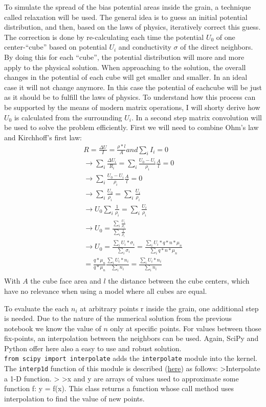 \documentclass[11pt]{article}
\begin{document}
To simulate the spread of the bias potential areas inside the grain, a
technique called relaxation will be used. The general idea is to guess
an initial potential distribution, and then, based on the laws of
physics, iteratively correct this guess. The correction is done by
re-calculating each time the potential \(U_0\) of one center-``cube''
based on potential \(U_i\) and conductivity \(\sigma\) of the direct
neighbors. By doing this for each ``cube'', the potential distribution
will more and more apply to the physical solution. When approaching to
the solution, the overall changes in the potential of each cube will get
smaller and smaller. In an ideal case it will not change anymore. In
this case the potential of eachcube will be just as it should be to
fulfill the laws of physics. To understand how this process can be
supported by the means of modern matrix operations, I will shorty derive
how \(U_0\) is calculated from the surrounding \(U_i\). In a second step
matrix convolution will be used to solve the problem efficiently. First
we will need to combine Ohm's law and Kirchhoff's first law:
\begin{align}
R  = \frac{\Delta U}{I} = \frac{{\rho}*l}{A} and \sum_{i}I_i=0\\
\rightarrow \sum_{i}\frac{\Delta U_i}{R_i} = \sum_{i}\frac{U_0-U_i}{\rho_i}\frac{A}{l}=0\\
\rightarrow \sum_{i}\frac{U_0-U_i}{\rho_i}\frac{A}{l}=0\\
\rightarrow \sum_{i}\frac{U_0}{\rho_i}=\sum_{i}\frac{U_i}{\rho_i}\\
\rightarrow U_0\sum_{i}\frac{1}{\rho_i}=\sum_{i}\frac{U_i}{\rho_i}\\
\rightarrow U_0=\frac{\sum_{i}\frac{U_i}{\rho_i}}{\sum_{i}\frac{1}{\rho_i}}\\
\rightarrow U_0=\frac{\sum_{i}{U_i*\sigma_i}}{\sum_{i}{\sigma_i}}=\frac{\sum_{i}{U_i*q*n*\mu_n }}{\sum_{i}{q*n*\mu_n }}\\=\frac{q*\mu_n}{q*\mu_n} \frac{\sum_{i}{U_i*n_i}}{\sum_{i}{n_i}}=\frac{\sum_{i}{U_i*n_i}}{\sum_{i}{n_i}}\label{u_center}\tag{$U_0$ from $U_i$}\\
\end{align} With \(A\) the cube face area and \(l\) the distance between
the cube centers, which have no relevance when using a model where all
cubes are equal.

    To evaluate the each \(n_i\) at arbitrary points r inside the grain, one
additional step is needed. Due to the nature of the numerical solution
from the previous notebook we know the value of \(n\) only at specific
points. For values between those fix-points, an interpolation between
the neighbors can be used. Again, SciPy and Python offer here also a
easy to use and robust solution.
\texttt{from\ scipy\ import\ interpolate} adds the \texttt{interpolate}
module into the kernel. The \texttt{interp1d} function of this module is
described
(\href{https://docs.scipy.org/doc/scipy/reference/generated/scipy.interpolate.interp1d.htm}{here})
as follows: \textgreater Interpolate a 1-D function. \textgreater{}
\textgreater x and y are arrays of values used to approximate some
function f: y = f(x). This class returns a function whose call method
uses interpolation to find the value of new points.
\end{document}
